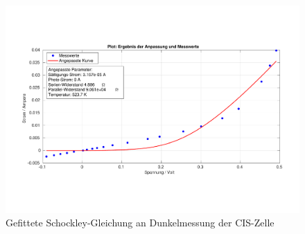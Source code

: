 \begin{figure}[ht]
    \centering
    \includegraphics[width = \linewidth]{Bilder/CISDunkelPlot.pdf}
    \caption{Gefittete Schockley-Gleichung an Dunkelmessung der CIS-Zelle}
\end{figure}


